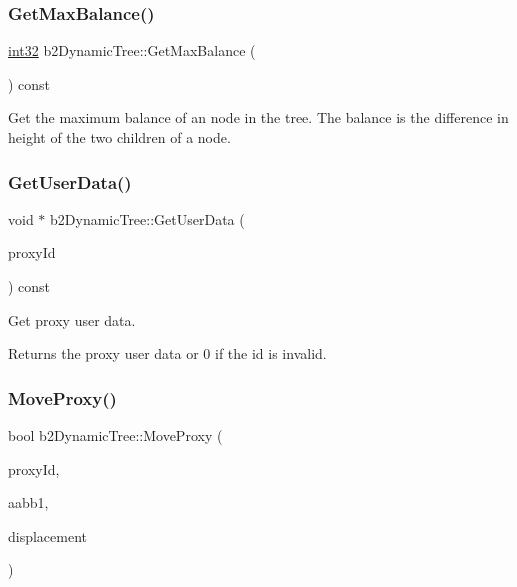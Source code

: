 \subsubsection{\texorpdfstring{GetMaxBalance()}{GetMaxBalance()}}
{\footnotesize\ttfamily \mbox{\hyperlink{b2_settings_8h_a43d43196463bde49cb067f5c20ab8481}{int32}} b2\+Dynamic\+Tree\+::\+Get\+Max\+Balance (\begin{DoxyParamCaption}{ }\end{DoxyParamCaption}) const}

Get the maximum balance of an node in the tree. The balance is the difference in height of the two children of a node. \mbox{\label{classb2_dynamic_tree_aa8399f9440707780f267696098e8b920}} 
\subsubsection{\texorpdfstring{GetUserData()}{GetUserData()}}
{\footnotesize\ttfamily void $\ast$ b2\+Dynamic\+Tree\+::\+Get\+User\+Data (\begin{DoxyParamCaption}\item[{\mbox{\hyperlink{b2_settings_8h_a43d43196463bde49cb067f5c20ab8481}{int32}}}]{proxy\+Id }\end{DoxyParamCaption}) const\hspace{0.3cm}{\ttfamily [inline]}}

Get proxy user data. \begin{DoxyReturn}{Returns}
the proxy user data or 0 if the id is invalid. 
\end{DoxyReturn}
\mbox{\label{classb2_dynamic_tree_a7748252811f3c575015931399cbe4daa}} 
\subsubsection{\texorpdfstring{MoveProxy()}{MoveProxy()}}
{\footnotesize\ttfamily bool b2\+Dynamic\+Tree\+::\+Move\+Proxy (\begin{DoxyParamCaption}\item[{\mbox{\hyperlink{b2_settings_8h_a43d43196463bde49cb067f5c20ab8481}{int32}}}]{proxy\+Id,  }\item[{const \mbox{\hyperlink{structb2_a_a_b_b}{b2\+A\+A\+BB}} \&}]{aabb1,  }\item[{const \mbox{\hyperlink{structb2_vec2}{b2\+Vec2}} \&}]{displacement }\end{DoxyParamCaption})}

